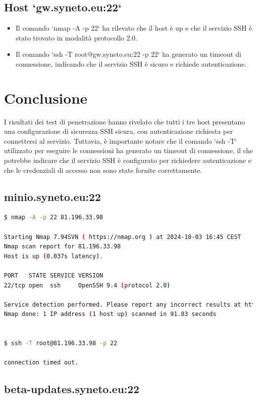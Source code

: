 \subsection{Host `gw.syneto.eu:22`}
\begin{itemize}
\item Il comando `nmap -A -p 22` ha rilevato che il host è up e che il servizio SSH è stato trovato in modalità protocollo 2.0.
\item Il comando `ssh -T root@gw.syneto.eu:22 -p 22` ha generato un timeout di connessione, indicando che il servizio SSH è sicuro e richiede autenticazione.
\end{itemize}
\section{Conclusione}

I risultati dei test di penetrazione hanno rivelato che tutti i tre host presentano una configurazione di sicurezza SSH sicura, con autenticazione richiesta per connettersi al servizio. Tuttavia, è importante notare che il comando `ssh -T` utilizzato per eseguire le connessioni ha generato un timeout di connessione, il che potrebbe indicare che il servizio SSH è configurato per richiedere autenticazione e che le credenziali di accesso non sono state fornite correttamente.

\subsection*{minio.syneto.eu:22}

\begin{lstlisting}[language=bash,breaklines=true,postbreak=\mbox{\textcolor{red}{$\hookrightarrow$}\space}]
$ nmap -A -p 22 81.196.33.98

Starting Nmap 7.94SVN ( https://nmap.org ) at 2024-10-03 16:45 CEST
Nmap scan report for 81.196.33.98
Host is up (0.037s latency).

PORT   STATE SERVICE VERSION
22/tcp open  ssh     OpenSSH 9.4 (protocol 2.0)

Service detection performed. Please report any incorrect results at https://nmap.org/submit/ .
Nmap done: 1 IP address (1 host up) scanned in 91.83 seconds


$ ssh -T root@81.196.33.98 -p 22

connection timed out.\end{lstlisting}

\subsection*{beta-updates.syneto.eu:22}


